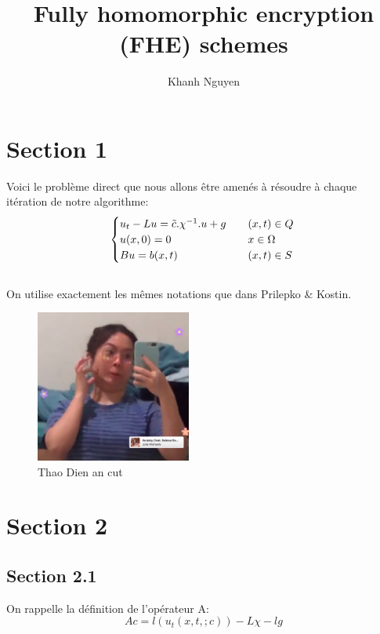 \documentclass[a4paper]{article}
\title{Fully homomorphic encryption (FHE) schemes}
\begin{document}
	
	\maketitle
	\author{Khanh Nguyen}
	
	\section{Section 1}
	
	Voici le problème direct que nous allons être amenés à résoudre à chaque itération de notre algorithme:
	\begin{equation}
		\begin{cases}
			u_{t} - Lu = \tilde{c}.\chi^{-1}.u + g &\quad (x,t)\in Q \\
			u(x,0) = 0 &\quad x\in \Omega \\
			Bu = b(x,t) &\quad (x,t) \in S\\
		\end{cases}\\
	\end{equation}\\
	
	On utilise exactement les mêmes notations que dans Prilepko \& Kostin.
	\begin{figure}
		\centering
		\includegraphics[height=5cm]{./resources/figures/test.png}
		\caption{Thao Dien an cut}
	\end{figure}
	
	
	\section{Section 2}
	
	\subsection{Section 2.1}
	
	On rappelle la définition de l'opérateur A:
	\begin{equation}
		Ac = l(u_{t}(x,t,;c)) - L\chi - lg
	\end{equation}
	
\end{document}
